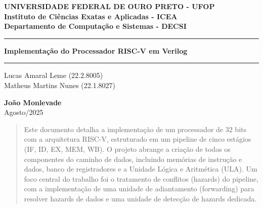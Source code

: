 \documentclass[12pt, a4paper]{article}
\begin{document}
\begin{titlepage}
    \centering
    
    \vspace*{1cm} 
    {\large \textbf{UNIVERSIDADE FEDERAL DE OURO PRETO - UFOP}}\\[0.5cm]
    {\normalsize \textbf{Instituto de Ciências Exatas e Aplicadas - ICEA}}\\[0.2cm]
    {\normalsize \textbf{Departamento de Computação e Sistemas - DECSI}}
    
    \vfill %
    
    \hrule\vspace{0.4cm}
    {\Huge \textbf{Implementação do Processador RISC-V em Verilog}}\\[0.4cm]
    \hrule
    
    \vfill %
    
    \begin{minipage}{0.5\textwidth}
        \centering
        \large Lucas Amaral Leme (22.2.8005)\\[0.3cm]
        \large Matheus Martins Nunes (22.1.8027)
    \end{minipage}
    
    \vfill %
    
    {\large \textbf{João Monlevade}}\\[0.5cm]
    {\large Agosto/2025}
    
\end{titlepage}

\tableofcontents
\newpage

\begin{abstract}
\noindent Este documento detalha a implementação de um processador de 32 bits com a arquitetura RISC-V, estruturado em um pipeline de cinco estágios (IF, ID, EX, MEM, WB). O projeto abrange a criação de todos os componentes do caminho de dados, incluindo memórias de instrução e dados, banco de registradores e a Unidade Lógica e Aritmética (ULA). Um foco central do trabalho foi o tratamento de conflitos (hazards) do pipeline, com a implementação de uma unidade de adiantamento (forwarding) para resolver hazards de dados e uma unidade de detecção de hazards dedicada.
\end{abstract}
\end{document}
